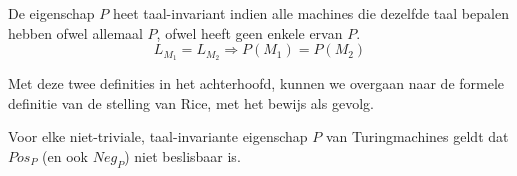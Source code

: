 \documentclass[
10pt,
a4paper,
oneside,
headinclude,footinclude, 
BCOR5mm,
]{scrartcl}
\begin{document}
\begin{theorem} 
	De eigenschap $P$ heet taal-invariant indien alle machines die dezelfde taal bepalen hebben ofwel allemaal $P$, ofwel heeft geen enkele ervan $P$.
	$$L_{M_1} = L_{M_2} \Rightarrow P(M_1) = P(M_2)$$
\end{theorem}

\noindent Met deze twee definities in het achterhoofd, kunnen we overgaan naar de formele definitie van de stelling van Rice, met het bewijs als gevolg.

\begin{theorem}
	Voor elke niet-triviale, taal-invariante eigenschap $P$ van Turingmachines geldt dat $Pos_P$ (en ook $Neg_P$) niet beslisbaar is.
\end{theorem}
\end{document}
